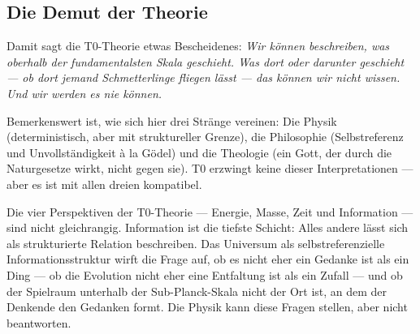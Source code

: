 \subsection{Die Demut der Theorie}

Damit sagt die T0-Theorie etwas Bescheidenes: \emph{Wir können beschreiben, was oberhalb der fundamentalsten Skala geschieht. Was dort oder darunter geschieht --- ob dort jemand Schmetterlinge fliegen lässt --- das können wir nicht wissen. Und wir werden es nie können.}

Bemerkenswert ist, wie sich hier drei Stränge vereinen: Die Physik (deterministisch, aber mit struktureller Grenze), die Philosophie (Selbstreferenz und Unvollständigkeit à la Gödel) und die Theologie (ein Gott, der durch die Naturgesetze wirkt, nicht gegen sie). T0 erzwingt keine dieser Interpretationen --- aber es ist mit allen dreien kompatibel.

\begin{kerngedanke}
Die vier Perspektiven der T0-Theorie --- Energie, Masse, Zeit und Information --- sind nicht gleichrangig. Information ist die tiefste Schicht: Alles andere lässt sich als strukturierte Relation beschreiben. Das Universum als selbstreferenzielle Informationsstruktur wirft die Frage auf, ob es nicht eher ein Gedanke ist als ein Ding --- ob die Evolution nicht eher eine Entfaltung ist als ein Zufall --- und ob der Spielraum unterhalb der Sub-Planck-Skala nicht der Ort ist, an dem der Denkende den Gedanken formt. Die Physik kann diese Fragen stellen, aber nicht beantworten.
\end{kerngedanke}
